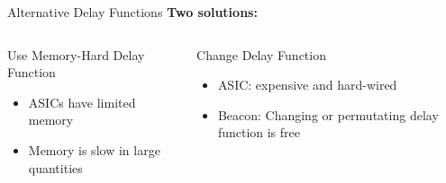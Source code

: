 \begin{frame}{Alternative Delay Functions}
    \centering
    \textbf{Two solutions:}

    \vspace{.5cm}
    
    \begin{columns}[T, onlytextwidth]
        \begin{block}{Use Memory-Hard Delay Function}
            \begin{itemize}
                \item ASICs have limited memory
                \item Memory is slow in large quantities
            \end{itemize}
        \end{block}

        \begin{block}{Change Delay Function}
            \begin{itemize}
                \item ASIC: expensive and hard-wired
                \item Beacon: Changing or permutating delay function is free
            \end{itemize}
        \end{block}
    \end{columns}
\end{frame}
